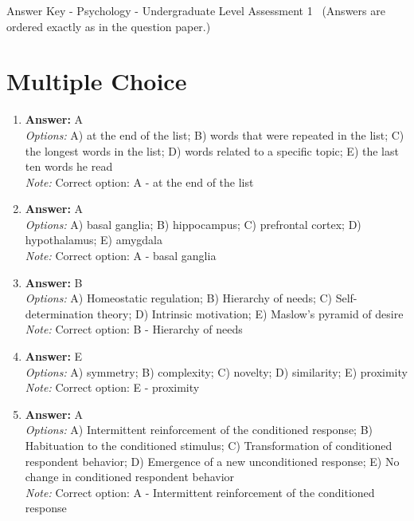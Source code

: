 \documentclass[12pt]{article}
\begin{document}
\begin{center}
Answer Key - Psychology - Undergraduate Level Assessment 1 \
\small (Answers are ordered exactly as in the question paper.)
\end{center}

\section*{Multiple Choice}
\begin{enumerate}[label=\arabic*.]
\item \textbf{Answer:} A
\\ \textit{Options:} A) at the end of the list; B) words that were repeated in the list; C) the longest words in the list; D) words related to a specific topic; E) the last ten words he read
\\ \textit{Note:} Correct option: A - at the end of the list
\item \textbf{Answer:} A
\\ \textit{Options:} A) basal ganglia; B) hippocampus; C) prefrontal cortex; D) hypothalamus; E) amygdala
\\ \textit{Note:} Correct option: A - basal ganglia
\item \textbf{Answer:} B
\\ \textit{Options:} A) Homeostatic regulation; B) Hierarchy of needs; C) Self-determination theory; D) Intrinsic motivation; E) Maslow's pyramid of desire
\\ \textit{Note:} Correct option: B - Hierarchy of needs
\item \textbf{Answer:} E
\\ \textit{Options:} A) symmetry; B) complexity; C) novelty; D) similarity; E) proximity
\\ \textit{Note:} Correct option: E - proximity
\item \textbf{Answer:} A
\\ \textit{Options:} A) Intermittent reinforcement of the conditioned response; B) Habituation to the conditioned stimulus; C) Transformation of conditioned respondent behavior; D) Emergence of a new unconditioned response; E) No change in conditioned respondent behavior
\\ \textit{Note:} Correct option: A - Intermittent reinforcement of the conditioned response
\end{enumerate}
\end{document}
